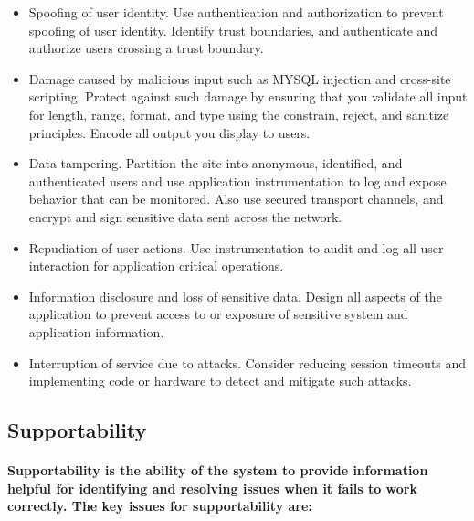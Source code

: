 \documentclass[../Psychological_system_web_application.tex]{subfiles}
\begin{document}
				\begin{itemize}
					\item
						Spoofing of user identity. Use authentication and authorization to prevent spoofing of user identity. Identify trust boundaries, and authenticate and authorize users crossing a trust boundary.
					\item
						Damage caused by malicious input such as \gls{MYSQL} injection and cross-site scripting. Protect against such damage by ensuring that you validate all input for length, range, format, and type using the constrain, reject, and sanitize principles. Encode all output you display to users.
					\item
						Data tampering. Partition the site into anonymous, identified, and authenticated users and use application instrumentation to log and expose behavior that can be monitored. Also use secured transport channels, and encrypt and sign sensitive data sent across the network.
					\item
						Repudiation of user actions. Use instrumentation to audit and log all user interaction for application critical operations.
					\item
						Information disclosure and loss of sensitive data. Design all aspects of the application to prevent access to or exposure of sensitive system and application information.
					\item
						Interruption of service due to   attacks. Consider reducing session timeouts and implementing code or hardware to detect and mitigate such attacks.
					
				\end{itemize}
				
			
			\subsection{Supportability}
			
				\paragraph{\gls{Supportability} is the ability of the system to provide information helpful for identifying and resolving issues when it fails to work correctly. The key issues for supportability are:}
			
\end{document}
